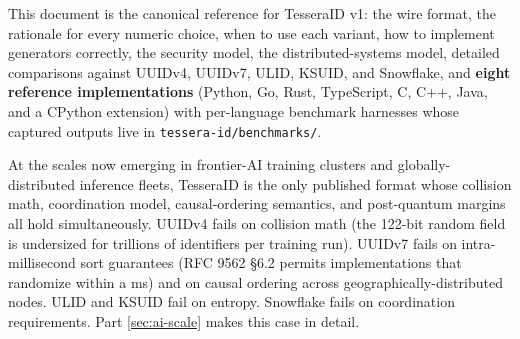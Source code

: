 This document is the canonical reference for TesseraID v1: the wire format, the rationale for every numeric choice, when to use each variant, how to implement generators correctly, the security model, the distributed-systems model, detailed comparisons against UUIDv4, UUIDv7, ULID, KSUID, and Snowflake, and \textbf{eight reference implementations} (Python, Go, Rust, TypeScript, C, C++, Java, and a CPython extension) with per-language benchmark harnesses whose captured outputs live in \texttt{tessera-id/benchmarks/}.

\begin{calloutinfo}
At the scales now emerging in frontier-AI training clusters and globally-distributed inference fleets, TesseraID is the only published format whose collision math, coordination model, causal-ordering semantics, and post-quantum margins all hold simultaneously. UUIDv4 fails on collision math (the 122-bit random field is undersized for trillions of identifiers per training run). UUIDv7 fails on intra-millisecond sort guarantees (RFC 9562 §6.2 permits implementations that randomize within a ms) and on causal ordering across geographically-distributed nodes. ULID and KSUID fail on entropy. Snowflake \citep{snowflake} fails on coordination requirements. Part \ref{sec:ai-scale} makes this case in detail.
\end{calloutinfo}

